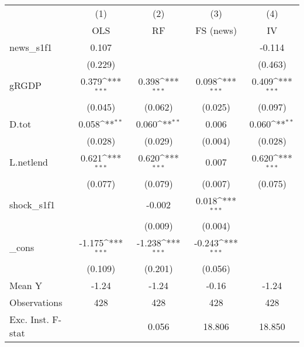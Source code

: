 {
\def\sym#1{\ifmmode^{#1}\else\(^{#1}\)\fi}
\begin{tabular}{l*{4}{c}}
\toprule
            &\multicolumn{1}{c}{(1)}&\multicolumn{1}{c}{(2)}&\multicolumn{1}{c}{(3)}&\multicolumn{1}{c}{(4)}\\
            &\multicolumn{1}{c}{OLS}&\multicolumn{1}{c}{RF}&\multicolumn{1}{c}{FS (news)}&\multicolumn{1}{c}{IV}\\
\midrule
news\_s1f1   &       0.107         &                     &                     &      -0.114         \\
            &     (0.229)         &                     &                     &     (0.463)         \\
\addlinespace
gRGDP       &       0.379\sym{***}&       0.398\sym{***}&       0.098\sym{***}&       0.409\sym{***}\\
            &     (0.045)         &     (0.062)         &     (0.025)         &     (0.097)         \\
\addlinespace
D.tot       &       0.058\sym{**} &       0.060\sym{**} &       0.006         &       0.060\sym{**} \\
            &     (0.028)         &     (0.029)         &     (0.004)         &     (0.028)         \\
\addlinespace
L.netlend   &       0.621\sym{***}&       0.620\sym{***}&       0.007         &       0.620\sym{***}\\
            &     (0.077)         &     (0.079)         &     (0.007)         &     (0.075)         \\
\addlinespace
shock\_s1f1  &                     &      -0.002         &       0.018\sym{***}&                     \\
            &                     &     (0.009)         &     (0.004)         &                     \\
\addlinespace
\_cons      &      -1.175\sym{***}&      -1.238\sym{***}&      -0.243\sym{***}&                     \\
            &     (0.109)         &     (0.201)         &     (0.056)         &                     \\
\midrule
Mean Y      &       -1.24         &       -1.24         &       -0.16         &       -1.24         \\
Observations&         428         &         428         &         428         &         428         \\
Exc. Inst. F-stat&                     &       0.056         &      18.806         &      18.850         \\
\bottomrule
\end{tabular}
}
